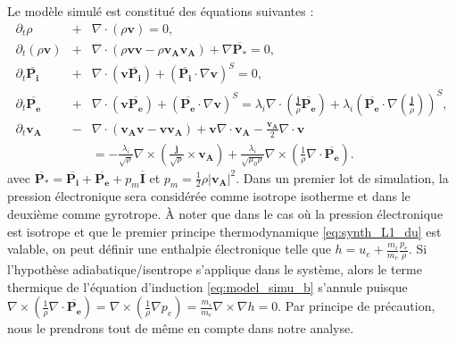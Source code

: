 Le modèle simulé est constitué des équations suivantes :
\begin{eqnarray}
\label{eq:model_simu_r} \partial_t \rho &+& \nabla \cdot \left(\rho \boldsymbol{v}\right) = 0,\\
\label{eq:model_simu_v} \partial_t \left(\rho \boldsymbol{v}\right) &+& \nabla \cdot \left(\rho \boldsymbol{v}\boldsymbol{v} - \rho \boldsymbol{v_A}\boldsymbol{v_A}\right) +  \nabla \overline{\boldsymbol{P_*}}  = 0,  \\
\label{eq:model_simu_Pi} \partial_t \overline{\boldsymbol{P_i}} &+& \nabla \cdot \left( \boldsymbol{v} \overline{\boldsymbol{P_i}} \right) +  \left(\overline{\boldsymbol{P_i}} \cdot \nabla \boldsymbol{v}\right)^S   = 0,  \\
\label{eq:model_simu_Pe} \partial_t \overline{\boldsymbol{P_{e}}} &+& \nabla \cdot \left( \boldsymbol{v}  \overline{\boldsymbol{P_{e}}} \right) +  \left(\overline{\boldsymbol{P_{e}}} \cdot \nabla \boldsymbol{v}\right)^S   =  \lambda_i \nabla \cdot  \left(\frac{\boldsymbol{j}}{\rho} \overline{\boldsymbol{P_{e}}}\right) +  \lambda_i \left(\overline{\boldsymbol{P_{e}}} \cdot \nabla \left(\frac{\boldsymbol{j}}{\rho} \right)\right)^S ,  \\
\label{eq:model_simu_b} \partial_t \boldsymbol{v_A} &-&  \nabla \cdot \left(\boldsymbol{v_A}\boldsymbol{v} - \boldsymbol{v}\boldsymbol{v_A}\right) +  \boldsymbol{v} \nabla \cdot \boldsymbol{v_A} -  \frac{\boldsymbol{v_A}}{2}  \nabla \cdot \boldsymbol{v} \nonumber \\ 
&&=  - \frac{\lambda_i}{ \sqrt{\rho} } \nabla \times\left(\frac{\boldsymbol{j}}{\sqrt{\rho}}  \times \boldsymbol{v_A}\right)  + \frac{\lambda_i}{ \sqrt{\mu_0\rho} }  \nabla \times \left(\frac{1}{\rho} \nabla \cdot \overline{\boldsymbol{P_{e}}}\right). 
\end{eqnarray}
 avec $\overline{\boldsymbol{P_*}} = \overline{\boldsymbol{P_{i}}} + \overline{\boldsymbol{P_{e}}}  + p_m \overline{\boldsymbol{I}} $ et $p_m = \frac{1}{2}\rho |\boldsymbol{v_A}|^2$. Dans un premier lot de simulation, la pression électronique sera considérée comme isotrope isotherme et dans le deuxième comme gyrotrope.  À noter que dans le cas où la pression électronique est isotrope et que le premier principe thermodynamique \eqref{eq:synth_L1_du} est valable, on peut définir une enthalpie électronique telle que $h = u_e + \frac{m_i}{m_e}\frac{p_e}{\rho}$. Si l'hypothèse adiabatique/isentrope s'applique dans le système, alors le terme thermique de l'équation d'induction \eqref{eq:model_simu_b} s'annule puisque $\nabla \times \left(\frac{1}{\rho} \nabla \cdot \overline{\boldsymbol{P_{e}}}\right) = \nabla \times \left(\frac{1}{\rho} \nabla p_{e}\right) = \frac{m_i}{m_e} \nabla \times \nabla h = 0$. Par principe de précaution, nous le prendrons tout de même en compte dans notre analyse.  

